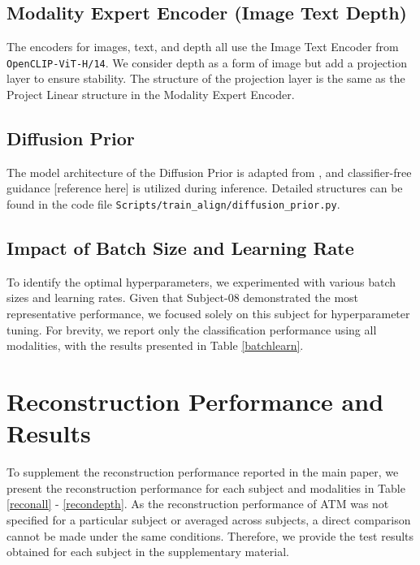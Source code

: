 \documentclass[letterpaper]{article} %
\begin{document}
\subsection{Modality Expert Encoder (Image Text Depth)}

The encoders for images, text, and depth all use the Image Text Encoder from \verb|OpenCLIP-ViT-H/14|. We consider depth as a form of image but add a projection layer to ensure stability. The structure of the projection layer is the same as the Project Linear structure in the Modality Expert Encoder.

\subsection{Diffusion Prior}

The model architecture of the Diffusion Prior is adapted from \cite{li2024visualdecodingreconstructioneeg}, and classifier-free guidance [reference here] is utilized during inference. Detailed structures can be found in the code file \verb|Scripts/train_align/diffusion_prior.py|.

\subsection{Impact of Batch Size and Learning Rate}

To identify the optimal hyperparameters, we experimented with various batch sizes and learning rates. Given that Subject-08 demonstrated the most representative performance, we focused solely on this subject for hyperparameter tuning. For brevity, we report only the classification performance using all modalities, with the results presented in Table \ref{batchlearn}.

\section{Reconstruction Performance and Results}

To supplement the reconstruction performance reported in the main paper, we present the reconstruction performance for each subject and modalities in Table \ref{reconall} - \ref{recondepth}. As the reconstruction performance of ATM\cite{li2024visualdecodingreconstructioneeg} was not specified for a particular subject or averaged across subjects, a direct comparison cannot be made under the same conditions. Therefore, we provide the test results obtained for each subject in the supplementary material. 
\end{document}
